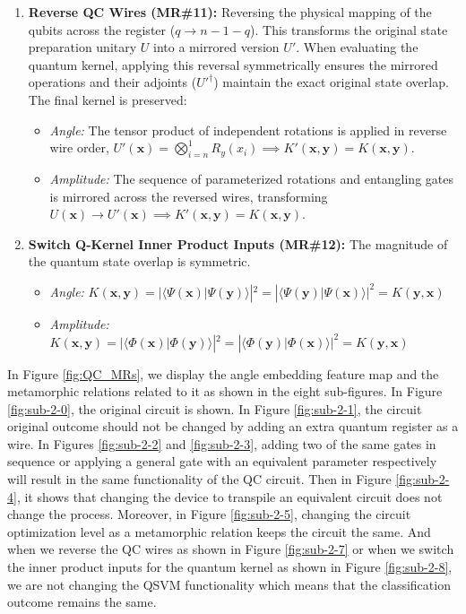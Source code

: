 \documentclass[12pt,a4paper]{article}
\begin{document}
\begin{enumerate}
		\item \textbf{Reverse QC Wires (MR\#11):} Reversing the physical mapping of the qubits across the register ($q \to n-1-q$). This transforms the original state preparation unitary $U$ into a mirrored version $U'$. When evaluating the quantum kernel, applying this reversal symmetrically ensures the mirrored operations and their adjoints ($U'^\dagger$) maintain the exact original state overlap. The final kernel is preserved:
		\begin{itemize}
			\item \textit{Angle:} The tensor product of independent rotations is applied in reverse wire order, $U'(\mathbf{x}) = \bigotimes_{i=n}^{1} R_y(x_i) \implies K'(\mathbf{x}, \mathbf{y}) = K(\mathbf{x}, \mathbf{y})$.
			\item \textit{Amplitude:} The sequence of parameterized rotations and entangling gates is mirrored across the reversed wires, transforming $U(\mathbf{x}) \to U'(\mathbf{x}) \implies K'(\mathbf{x}, \mathbf{y}) = K(\mathbf{x}, \mathbf{y})$.
		\end{itemize}
			
			\item \textbf{Switch Q-Kernel Inner Product Inputs (MR\#12):} The magnitude of the quantum state overlap is symmetric. 
			\begin{itemize}
				\item \textit{Angle:} $K(\mathbf{x}, \mathbf{y}) = |\langle \Psi(\mathbf{x}) | \Psi(\mathbf{y}) \rangle|^2 = |\langle \Psi(\mathbf{y}) | \Psi(\mathbf{x}) \rangle|^2 = K(\mathbf{y}, \mathbf{x})$
				\item \textit{Amplitude:} $K(\mathbf{x}, \mathbf{y}) = |\langle \Phi(\mathbf{x}) | \Phi(\mathbf{y}) \rangle|^2 = |\langle \Phi(\mathbf{y}) | \Phi(\mathbf{x}) \rangle|^2 = K(\mathbf{y}, \mathbf{x})$
			\end{itemize}
		\end{enumerate}
	
	
	In Figure \ref{fig:QC_MRs}, we display the angle embedding feature map and the metamorphic relations related to it as shown in the eight sub-figures. In Figure \ref{fig:sub-2-0}, the original circuit is shown. In Figure \ref{fig:sub-2-1}, the circuit original outcome should not be changed by adding an extra quantum register as a wire. In Figures \ref{fig:sub-2-2} and \ref{fig:sub-2-3}, adding two of the same gates in sequence or applying a general gate with an equivalent parameter respectively will result in the same functionality of the QC circuit. Then in Figure \ref{fig:sub-2-4}, it shows that changing the device to transpile an equivalent circuit does not change the process. Moreover, in Figure \ref{fig:sub-2-5}, changing the circuit optimization level as a metamorphic relation keeps the circuit the same. And when we reverse the QC wires as shown in Figure \ref{fig:sub-2-7} or when we switch the inner product inputs for the quantum kernel as shown in Figure \ref{fig:sub-2-8}, we are not changing the QSVM functionality which means that the classification outcome remains the same.
	
\end{document}
